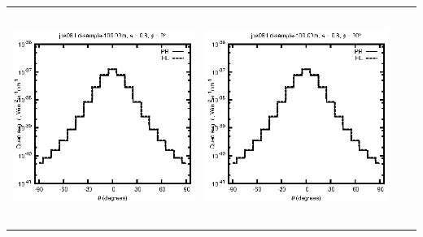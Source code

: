 \documentclass[10pt,a4paper]{article}
\begin{document}
\begin{adjustwidth}{-1.2in}{-1.2in}
\begin{tabular}{c c c c}
\includegraphics[height=7cm]{../eps/jok08_Ld_sample_100.00m_fwd.eps} &
\includegraphics[height=7cm]{../eps/jok08_Ld_sample_100.00m_cross.eps} \\
\end{tabular}

\pagebreak


\end{adjustwidth}
\end{document}
